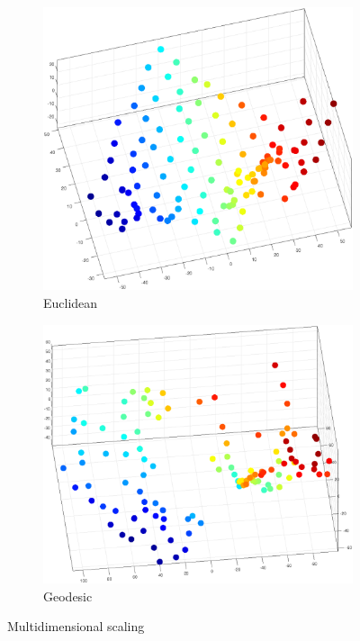 \begin{figure}
    \begin{subfigure}{.45\textwidth}
    \centering
    \includegraphics[width=.9\linewidth]{Figures/IR38_MDS_e.eps}
        \caption{Euclidean}
        \label{fig:sfig1}
    \end{subfigure}
    \begin{subfigure}{.45\textwidth}
    \centering
    \includegraphics[width=.9\linewidth]{Figures/IR38_MDS_g.eps}
        \caption{Geodesic}
        \label{fig:sfig2}
    \end{subfigure}
    \caption{Multidimensional scaling }
    \label{fig:GeoDist}
\end{figure}


